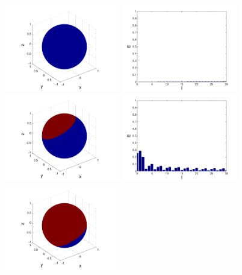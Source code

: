 \begin{refsection}
\begin{figure}
\centering
\includegraphics[width=0.45\textwidth]{kugel/Dkonstant/Kugel1_1.pdf}
\includegraphics[width=0.45\textwidth]{kugel/Dkonstant/Kugel1_2.pdf}
\includegraphics[width=0.45\textwidth]{kugel/Dkonstant/Kugel2_1.pdf}
\includegraphics[width=0.45\textwidth]{kugel/Dkonstant/Kugel2_2.pdf}
\includegraphics[width=0.45\textwidth]{kugel/Dkonstant/Kugel3_1.pdf}

\end{figure}
\end{refsection}
